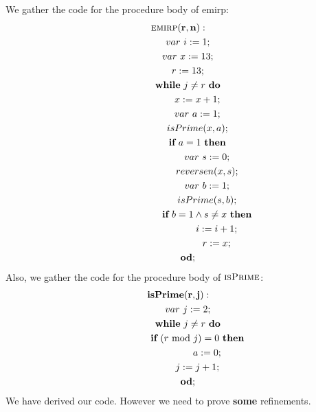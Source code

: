 \documentclass[a4paper,12pt,fleqn]{scrartcl}
\newcommand{\var}{\textrm{$var$ }}
\newcommand{\emirp}{\text{emirp}\xspace}
\newcommand{\Emirp}{\textsc{emirp}\xspace}
\newcommand{\isPrime}{\textsc{isPrime}\xspace}
\begin{document}
We gather the code for the procedure body of $\emirp$:
\begin{gather*}
  \mathbf{\Emirp(r,n):}\\
  \qquad \var i\Ass 1;\\
  \qquad \var x\Ass 13;\\
  \qquad r\Ass 13;\\
  \qquad \WHILE~j\neq r~\DO\\
  \qquad \qquad x\Ass {x+1};\\
  \qquad \qquad \var a\Ass 1;\\
  \qquad \qquad isPrime(x,a);\\
  \qquad \qquad \IF~a=1~\THEN\\
  \qquad \qquad \qquad \var s\Ass 0;\\
  \qquad \qquad \qquad reversen(x,s);\\
  \qquad \qquad \qquad \var b\Ass 1;\\
  \qquad \qquad \qquad isPrime(s,b);\\
  \qquad \qquad \qquad \IF~b=1\And s\neq x~\THEN\\
  \qquad \qquad \qquad \qquad i\Ass {i+1};\\
  \qquad \qquad \qquad \qquad r\Ass x;\\
  \qquad \OD;
\end{gather*}
Also, we gather the code for the procedure body of $\isPrime$:
\begin{gather*}
  \mathbf{isPrime(r,j):}\\
  \qquad \var j\Ass 2;\\
  \qquad \WHILE~j\neq r~\DO\\
  \qquad \qquad \IF~(r \textrm{ mod }j)=0~\THEN\\
  \qquad \qquad \qquad a\Ass 0;\\
  \qquad \qquad j\Ass {j+1};\\
  \qquad \OD;\\
\end{gather*}
We have derived our code. However we need to prove \textbf{\color{blue}some }\color{black} refinements.
\end{document}
